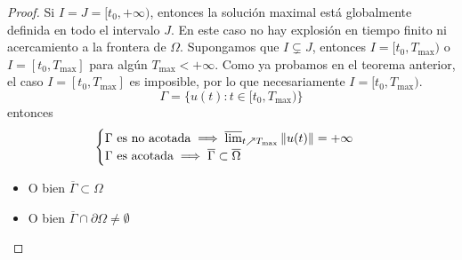 \begin{proof}
    Si $I = J = [t_0, +\infty)$, entonces la solución maximal está globalmente definida en todo el intervalo $J$. En este caso no hay explosión en tiempo finito ni acercamiento a la frontera de $\Omega$.
    Supongamos que $I \subsetneq J$, entonces $I = [t_0, T_{\text{max}})$ o $I = [t_0, T_{\text{max}}]$ para algún $T_{\text{max}} < +\infty$. Como ya probamos en el teorema anterior, el caso $I = [t_0, T_{\text{max}}]$ es imposible, por lo que necesariamente $I = [t_0, T_{\text{max}})$.
    \[
        \Gamma = \{ u(t) : t \in [t_0, T_{\text{max}}) \}
    \]
    entonces
    \[
        \begin{cases}
            \Gamma \text{ es no acotada} \implies \varlimsup_{t \nearrow T_{\text{max}}} \| u(t) \| = +\infty \\
            \Gamma \text{ es acotada} \implies \overline{\Gamma} \subset \overline{\Omega}
        \end{cases}
    \]
    \begin{itemize}
        \item O bien $\overline{\Gamma} \subset \Omega$ \item O bien $\overline{\Gamma} \cap \partial \Omega \neq \emptyset$
    \end{itemize}


\end{proof}
